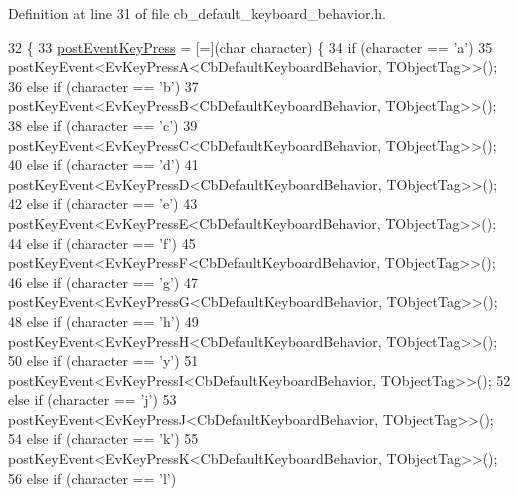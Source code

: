 Definition at line 31 of file cb\+\_\+default\+\_\+keyboard\+\_\+behavior.\+h.


\begin{DoxyCode}
32     \{
33         \hyperlink{classsm__three__some_1_1keyboard__client_1_1CbDefaultKeyboardBehavior_a9ad347df51cea719d08dc2d0024b2412}{postEventKeyPress} = [=](\textcolor{keywordtype}{char} character) \{
34             \textcolor{keywordflow}{if} (character == \textcolor{charliteral}{'a'})
35                 postKeyEvent<EvKeyPressA<CbDefaultKeyboardBehavior, TObjectTag>>();
36             \textcolor{keywordflow}{else} \textcolor{keywordflow}{if} (character == \textcolor{charliteral}{'b'})
37                 postKeyEvent<EvKeyPressB<CbDefaultKeyboardBehavior, TObjectTag>>();
38             \textcolor{keywordflow}{else} \textcolor{keywordflow}{if} (character == \textcolor{charliteral}{'c'})
39                 postKeyEvent<EvKeyPressC<CbDefaultKeyboardBehavior, TObjectTag>>();
40             \textcolor{keywordflow}{else} \textcolor{keywordflow}{if} (character == \textcolor{charliteral}{'d'})
41                 postKeyEvent<EvKeyPressD<CbDefaultKeyboardBehavior, TObjectTag>>();
42             \textcolor{keywordflow}{else} \textcolor{keywordflow}{if} (character == \textcolor{charliteral}{'e'})
43                 postKeyEvent<EvKeyPressE<CbDefaultKeyboardBehavior, TObjectTag>>();
44             \textcolor{keywordflow}{else} \textcolor{keywordflow}{if} (character == \textcolor{charliteral}{'f'})
45                 postKeyEvent<EvKeyPressF<CbDefaultKeyboardBehavior, TObjectTag>>();
46             \textcolor{keywordflow}{else} \textcolor{keywordflow}{if} (character == \textcolor{charliteral}{'g'})
47                 postKeyEvent<EvKeyPressG<CbDefaultKeyboardBehavior, TObjectTag>>();
48             \textcolor{keywordflow}{else} \textcolor{keywordflow}{if} (character == \textcolor{charliteral}{'h'})
49                 postKeyEvent<EvKeyPressH<CbDefaultKeyboardBehavior, TObjectTag>>();
50             \textcolor{keywordflow}{else} \textcolor{keywordflow}{if} (character == \textcolor{charliteral}{'y'})
51                 postKeyEvent<EvKeyPressI<CbDefaultKeyboardBehavior, TObjectTag>>();
52             \textcolor{keywordflow}{else} \textcolor{keywordflow}{if} (character == \textcolor{charliteral}{'j'})
53                 postKeyEvent<EvKeyPressJ<CbDefaultKeyboardBehavior, TObjectTag>>();
54             \textcolor{keywordflow}{else} \textcolor{keywordflow}{if} (character == \textcolor{charliteral}{'k'})
55                 postKeyEvent<EvKeyPressK<CbDefaultKeyboardBehavior, TObjectTag>>();
56             \textcolor{keywordflow}{else} \textcolor{keywordflow}{if} (character == \textcolor{charliteral}{'l'})

\end{DoxyCode}
